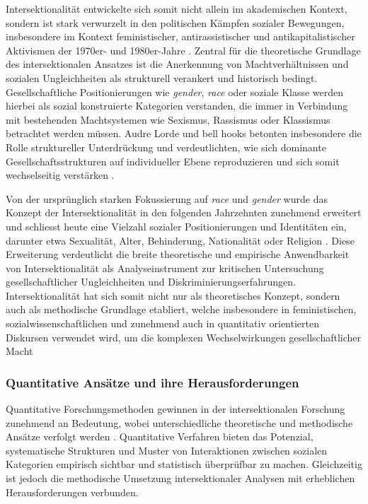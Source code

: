 Intersektionalität entwickelte sich somit nicht allein im akademischen Kontext, sondern ist stark verwurzelt in den politischen Kämpfen sozialer Bewegungen, insbesondere im Kontext feministischer, antirassistischer und antikapitalistischer Aktivismen der 1970er- und 1980er-Jahre \parencite{collinsBlackFeministThought2002}. Zentral für die theoretische Grundlage des intersektionalen Ansatzes ist die Anerkennung von Machtverhältnissen und sozialen Ungleichheiten als strukturell verankert und historisch bedingt. Gesellschaftliche Positionierungen wie \emph{gender}, \emph{race} oder soziale Klasse werden hierbei als sozial konstruierte Kategorien verstanden, die immer in Verbindung mit bestehenden Machtsystemen wie Sexismus, Rassismus oder Klassismus betrachtet werden müssen. Audre Lorde und bell hooks betonten insbesondere die Rolle struktureller Unterdrückung und verdeutlichten, wie sich dominante Gesellschaftsstrukturen auf individueller Ebene reproduzieren und sich somit wechselseitig verstärken \parencite{collinsBlackFeministThought2002, hancockWhenMultiplicationDoesnt2007}.

Von der ursprünglich starken Fokussierung auf \emph{race} und \emph{gender} wurde das Konzept der Intersektionalität in den folgenden Jahrzehnten zunehmend erweitert und schliesst heute eine Vielzahl sozialer Positionierungen und Identitäten ein, darunter etwa Sexualität, Alter, Behinderung, Nationalität oder Religion \parencite{bauerIntersectionalityQuantitativeResearch2021, bowlegInvitedReflectionQuantifying2016}. Diese Erweiterung verdeutlicht die breite theoretische und empirische Anwendbarkeit von Intersektionalität als Analyseinstrument zur kritischen Untersuchung gesellschaftlicher Ungleichheiten und Diskriminierungserfahrungen. Intersektionalität hat sich somit nicht nur als theoretisches Konzept, sondern auch als methodische Grundlage etabliert, welche insbesondere in feministischen, sozialwissenschaftlichen und zunehmend auch in quantitativ orientierten Diskursen verwendet wird, um die komplexen Wechselwirkungen gesellschaftlicher Macht


\subsubsection{Quantitative Ansätze und ihre Herausforderungen}

Quantitative Forschungsmethoden gewinnen in der intersektionalen Forschung zunehmend an Bedeutung, wobei unterschiedliche theoretische und methodische Ansätze verfolgt werden \parencite{bauerIntersectionalityQuantitativeResearch2021}. Quantitative Verfahren bieten das Potenzial, systematische Strukturen und Muster von Interaktionen zwischen sozialen Kategorien empirisch sichtbar und statistisch überprüfbar zu machen. Gleichzeitig ist jedoch die methodische Umsetzung intersektionaler Analysen mit erheblichen Herausforderungen verbunden.

